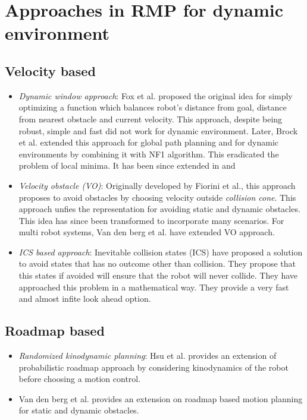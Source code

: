 \documentclass[rnd]{mas_proposal}
\begin{document}
\section{Approaches in RMP for dynamic environment}
\subsection{Velocity based}
\begin{itemize}
    \item \textit{Dynamic window approach}: Fox et al. \cite{fox1997dynamic} proposed the original idea for simply optimizing a function which balances robot's distance from goal, distance from nearest obstacle and current velocity. This approach, despite being robust, simple and fast did not work for dynamic environment. 
        Later, Brock et al. \cite{brock1999high} extended this approach for global path planning and for dynamic environments by combining it with NF1 algorithm. 
        This eradicated the problem of local minima. 
        It has been since extended in \cite{seder2007dynamic} and \cite{ogren2005convergent}
    \item \textit{Velocity obstacle (VO)}: Originally developed by Fiorini et al.\cite{fiorini1998motion}, this approach proposes to avoid obstacles by choosing velocity outside \textit{collision cone}.
        This approach unfies the representation for avoiding static and dynamic obstacles.
        This idea has since been transformed to incorporate many scenarios\cite{shiller2010nonlinear}\cite{owen2006a}\cite{owen2005motion}\cite{guy2009clearpath}. 
        For multi robot systems, Van den berg et al.\cite{van2008reciprocal}\cite{van2011reciprocal}\cite{van2006anytime} have extended VO approach.
    \item \textit{ICS based approach}: Inevitable collision states (ICS) \cite{fraichard2004inevitable}\cite{petti2005safe}\cite{martinez2009collision} have proposed a solution to avoid states that has no outcome other than collision. They propose that this states if avoided will ensure that the robot will never collide. They have approached this problem in a mathematical way. They provide a very fast and almost infite look ahead option\cite{mohanan2018a}.

\end{itemize}

\subsection{Roadmap based}
\begin{itemize}
    \item \textit{Randomized kinodynamic planning}: Hsu et al.\cite{hsu2002randomized} provides an extension of probabilistic roadmap approach by considering kinodynamics of the robot before choosing a motion control.
    \item Van den berg et al.\cite{van2005roadmap} provides an extension on roadmap based motion planning for static and dynamic obstacles.
\end{itemize}
\end{document}
